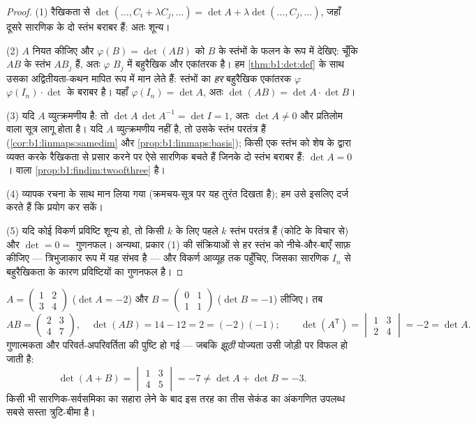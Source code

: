 \begin{proof}
(1) रैखिकता से $\det(\dots, C_i + \lambda C_j, \dots) = \det A +
\lambda\det(\dots, C_j, \dots)$, जहाँ दूसरे सारणिक के दो स्तंभ बराबर हैं:
अतः शून्य।

(2) $A$ नियत कीजिए और $\varphi(B) = \det(AB)$ को $B$ के स्तंभों के फलन के
रूप में देखिए: चूँकि $AB$ के स्तंभ $AB_j$ हैं, अतः $\varphi$ $B_j$ में
बहुरैखिक और एकांतरक है। हम \cref{thm:b1:det:def} के साथ उसका अद्वितीयता-कथन
मापित रूप में मान लेते हैं: स्तंभों का \emph{हर} बहुरैखिक एकांतरक
 $\varphi$ $\varphi(I_n) \cdot \det$ के बराबर है। यहाँ
$\varphi(I_n) = \det A$, अतः $\det(AB) = \det A \cdot \det B$।

(3) यदि $A$ व्युत्क्रमणीय है: तो $\det A\,\det A^{-1} = \det I = 1$, अतः
$\det A \neq 0$ और प्रतिलोम वाला सूत्र लागू होता है। यदि $A$ व्युत्क्रमणीय
नहीं है, तो उसके स्तंभ परतंत्र हैं (\cref{cor:b1:linmaps:samedim} और
\cref{prop:b1:linmaps:basis}); किसी एक स्तंभ को शेष के द्वारा व्यक्त करके
रैखिकता से प्रसार करने पर ऐसे सारणिक बचते हैं जिनके दो स्तंभ बराबर हैं:
$\det A = 0$।  वाला  \cref{prop:b1:findim:twoofthree} है।

(4) व्यापक रचना के साथ मान लिया गया (क्रमचय-सूत्र पर यह तुरंत दिखता है); हम
उसे इसलिए दर्ज करते हैं कि  प्रयोग कर सकें।

(5) यदि कोई विकर्ण प्रविष्टि शून्य हो, तो किसी $k$ के लिए पहले $k$ स्तंभ
परतंत्र हैं (कोटि के विचार से) और $\det = 0 =$ गुणनफल। अन्यथा, प्रकार (1)
की संक्रियाओं से हर स्तंभ को नीचे-और-बाएँ साफ़ कीजिए --- त्रिभुजाकार रूप में
यह संभव है --- और विकर्ण आव्यूह तक पहुँचिए, जिसका सारणिक $I_n$ से बहुरैखिकता
के कारण प्रविष्टियों का गुणनफल है।
\end{proof}

\begin{example}[नियम, संख्याओं पर जाँचे हुए]
\label{ex:b1:det:rulescheck}
$A = \begin{pmatrix} 1 & 2\\ 3 & 4\end{pmatrix}$ ($\det A = -2$) और $B =
\begin{pmatrix} 0 & 1\\ 1 & 1\end{pmatrix}$ ($\det B = -1$) लीजिए। तब
\[
AB = \begin{pmatrix} 2 & 3\\ 4 & 7\end{pmatrix},
\quad \det(AB) = 14 - 12 = 2 = (-2)(-1) ;
\qquad
\det(A^{\mathsf T}) = \begin{vmatrix} 1 & 3\\ 2 & 4
\end{vmatrix} = -2 = \det A .
\]
गुणात्मकता और परिवर्त-अपरिवर्तिता की पुष्टि हो गई --- जबकि \emph{झूठी}
योज्यता उसी जोड़ी पर विफल हो जाती है:
\[
\det(A + B) = \begin{vmatrix} 1 & 3\\ 4 & 5\end{vmatrix} = -7
\neq \det A + \det B = -3 .
\]
किसी भी सारणिक-सर्वसमिका का सहारा लेने के बाद इस तरह का तीस सेकंड का अंकगणित
उपलब्ध सबसे सस्ता त्रुटि-बीमा है।
\end{example}

